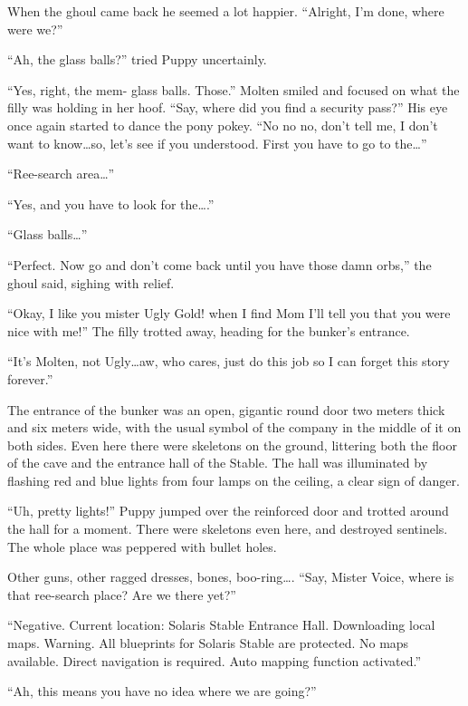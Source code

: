 When the ghoul came back he seemed a lot happier. ``Alright, I'm done, where were we?''

``Ah, the glass balls?'' tried Puppy uncertainly.

``Yes, right, the mem- glass balls. Those.'' Molten smiled and focused on what the filly was holding in her hoof. ``Say, where did you find a security pass?'' His eye once again started to dance the pony pokey. ``No no no, don't tell me, I don't want to know\dots so, let's see if you understood. First you have to go to the\dots''

``Ree-search area\dots''

``Yes, and you have to look for the\dots.''

``Glass balls\dots''

``Perfect. Now go and don't come back until you have those damn orbs,'' the ghoul said, sighing with relief.

``Okay, I like you mister Ugly Gold! when I find Mom I'll tell you that you were nice with me!'' The filly trotted away, heading for the bunker's entrance.

``It's Molten, not Ugly\dots aw, who cares, just do this job so I can forget this story forever.''

\horizonline


The entrance of the bunker was an open, gigantic round door two meters thick and six meters wide, with the usual symbol of the company in the middle of it on both sides. Even here there were skeletons on the ground, littering both the floor of the cave and the entrance hall of the Stable. The hall was illuminated by flashing red and blue lights from four lamps on the ceiling, a clear sign of danger.

``Uh, pretty lights!'' Puppy jumped over the reinforced door and trotted around the hall for a moment. There were skeletons even here, and destroyed sentinels. The whole place was peppered with bullet holes.

Other guns, other ragged dresses, bones, boo-ring\dots. ``Say, Mister Voice, where is that ree-search place? Are we there yet?''

``{\mt Negative. Current location: Solaris Stable Entrance Hall. Downloading local maps. Warning. All blueprints for Solaris Stable are protected. No maps available. Direct navigation is required. Auto mapping function activated.}''

``Ah, this means you have no idea where we are going?''

